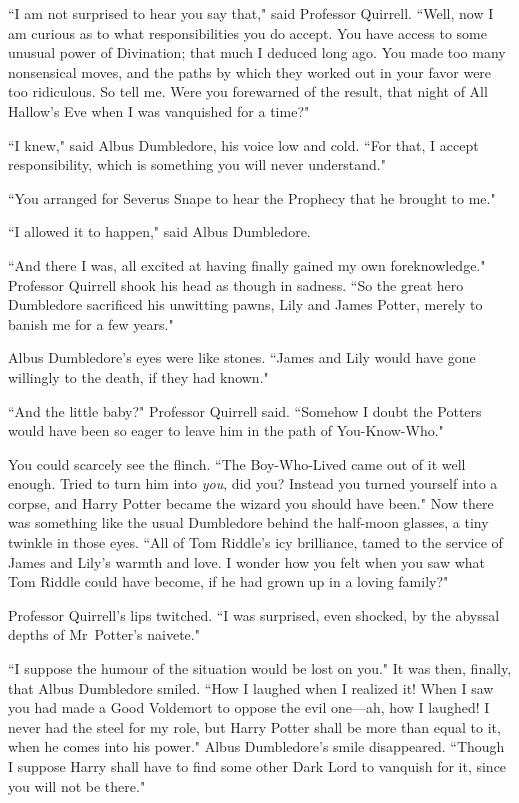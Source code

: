 ``I am not surprised to hear you say that," said Professor Quirrell. ``Well, now I am curious as to what responsibilities you do accept. You have access to some unusual power of Divination; that much I deduced long ago. You made too many nonsensical moves, and the paths by which they worked out in your favor were too ridiculous. So tell me. Were you forewarned of the result, that night of All Hallow's Eve when I was vanquished for a time?"

``I knew," said Albus Dumbledore, his voice low and cold. ``For that, I accept responsibility, which is something you will never understand."

``You arranged for Severus Snape to hear the Prophecy that he brought to me."

``I allowed it to happen," said Albus Dumbledore.

``And there I was, all excited at having finally gained my own foreknowledge." Professor Quirrell shook his head as though in sadness. ``So the great hero Dumbledore sacrificed his unwitting pawns, Lily and James Potter, merely to banish me for a few years."

Albus Dumbledore's eyes were like stones. ``James and Lily would have gone willingly to the death, if they had known."

``And the little baby?" Professor Quirrell said. ``Somehow I doubt the Potters would have been so eager to leave him in the path of You-Know-Who."

You could scarcely see the flinch. ``The Boy-Who-Lived came out of it well enough. Tried to turn him into \emph{you}, did you? Instead you turned yourself into a corpse, and Harry Potter became the wizard you should have been." Now there was something like the usual Dumbledore behind the half-moon glasses, a tiny twinkle in those eyes. ``All of Tom Riddle's icy brilliance, tamed to the service of James and Lily's warmth and love. I wonder how you felt when you saw what Tom Riddle could have become, if he had grown up in a loving family?"

Professor Quirrell's lips twitched. ``I was surprised, even shocked, by the abyssal depths of Mr~Potter's naivete."

``I suppose the humour of the situation would be lost on you." It was then, finally, that Albus Dumbledore smiled. ``How I laughed when I realized it! When I saw you had made a Good Voldemort to oppose the evil one—ah, how I laughed! I never had the steel for my role, but Harry Potter shall be more than equal to it, when he comes into his power." Albus Dumbledore's smile disappeared. ``Though I suppose Harry shall have to find some other Dark Lord to vanquish for it, since you will not be there."

